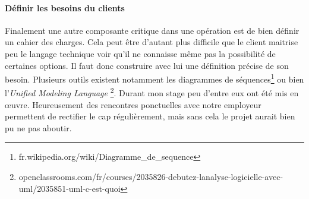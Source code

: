 \paragraph{Définir les besoins du clients}
Finalement une autre composante critique dans une opération est de bien définir un cahier des charges. Cela peut être d'autant plus difficile que le client maitrise peu le langage technique voir qu'il ne connaisse même pas la possibilité de certaines options. Il faut donc construire avec lui une définition précise de son besoin. Plusieurs outils existent notamment les diagrammes de séquences\footnote{fr.wikipedia.org/wiki/Diagramme\_de\_sequence}  ou bien l'\textit{Unified Modeling Language} \footnote{openclassrooms.com/fr/courses/2035826-debutez-lanalyse-logicielle-avec-uml/2035851-uml-c-est-quoi}. Durant mon stage peu d'entre eux ont été mis en œuvre. Heureusement des rencontres ponctuelles avec notre employeur permettent de rectifier le cap régulièrement, mais sans cela le projet aurait bien pu ne pas aboutir.
